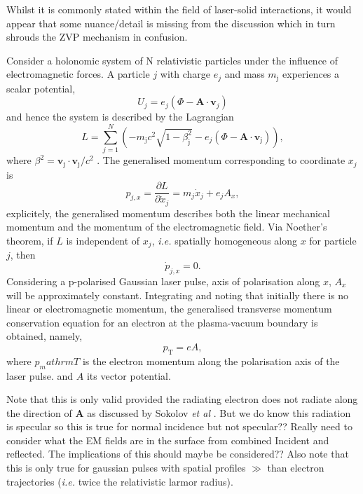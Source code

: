 Whilst it is commonly stated within the field of laser-solid interactions, it would appear that some nuance/detail is missing from the discussion which in turn shrouds the \ac{ZVP} mechanism in confusion.

Consider a holonomic system of N relativistic particles under the influence of electromagnetic forces. A particle $j$ with charge $e_j$ and mass $m_\mathrm{j}$ experiences a scalar potential,
\begin{equation}
	U_{j} = e_j(\Phi - \mathbf{A} \cdot \mathbf{v}_{j})
\end{equation}
and hence the system is described by the Lagrangian
\begin{equation}
	L = \sum^N_{j=1}\left( - m_\mathrm{j}c^2\sqrt{1-\beta^2_\mathrm{j}} - e_j(\Phi - \mathbf{A} \cdot \mathbf{v}_\mathrm{j}) \right),
\end{equation}
where $\beta^2 = \mathbf{v}_\mathrm{j}\cdot\mathbf{v}_\mathrm{j} /c^2$ \cite{goldstein_classical_mechanics}.
The generalised momentum corresponding to coordinate $x_j$ is
\begin{equation}
	p_{j,x} = \frac{\partial L}{\partial \dot{x}_j} = m_j\dot{x}_j + e_jA_x,
\end{equation}
explicitely, the generalised momentum describes both the linear mechanical momentum and the momentum of the electromagnetic field. Via Noether's theorem, if $L$ is independent of $x_j$, \textit{i.e.} spatially homogeneous along $x$ for particle $j$, then 
\begin{equation}
	\dot{p}_{j,x} = 0.
\end{equation}
Considering a p-polarised Gaussian laser pulse, axis of polarisation along $x$, $A_x$ will be approximately constant. Integrating and noting that initially there is no linear or electromagnetic momentum, the generalised transverse momentum conservation equation for an electron at the plasma-vacuum boundary is obtained, namely,
\begin{equation}
	p_\mathrm{T} = eA,
\end{equation}
where $p_mathrm{T}$ is the electron momentum along the polarisation axis of the laser pulse. and $A$ its vector potential.

Note that this is only valid provided the radiating electron does not radiate along the direction of $\mathbf{A}$ as discussed by Sokolov \textit{et al} \cite{sokolov_2009_DynamicsEmittingElectrons}. But we do know this radiation is specular so this is true for normal incidence but not specular?? Really need to consider what the EM fields are in the surface from combined Incident and reflected.
The implications of this should maybe be considered?? Also note that this is only true for gaussian pulses with spatial profiles $\gg$ than electron trajectories (\textit{i.e.} twice the relativistic larmor radius).

